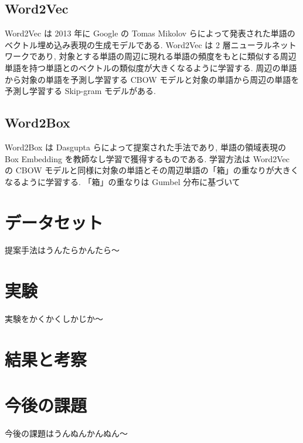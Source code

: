 \documentclass[twocolumn]{jarticle}     %
\begin{document}
\subsection{Word2Vec}
Word2Vec は 2013 年に Google の Tomas Mikolov らによって発表された単語のベクトル埋め込み表現の生成モデルである. 
Word2Vec は 2 層ニューラルネットワークであり, 対象とする単語の周辺に現れる単語の頻度をもとに類似する周辺単語を持つ単語とのベクトルの類似度が大きくなるように学習する. 
周辺の単語から対象の単語を予測し学習する CBOW モデルと対象の単語から周辺の単語を予測し学習する Skip-gram モデルがある.

\subsection{Word2Box}
Word2Box は Dasgupta らによって提案された手法であり, 単語の領域表現の Box Embedding を教師なし学習で獲得するものである. 
学習方法は Word2Vec の CBOW モデルと同様に対象の単語とその周辺単語の「箱」の重なりが大きくなるように学習する. 
「箱」の重なりは Gumbel 分布に基づいて

\section{データセット}
提案手法はうんたらかんたら〜

\section{実験}
実験をかくかくしかじか〜

\section{結果と考察}

\section{今後の課題}
今後の課題はうんぬんかんぬん〜


\end{document}
